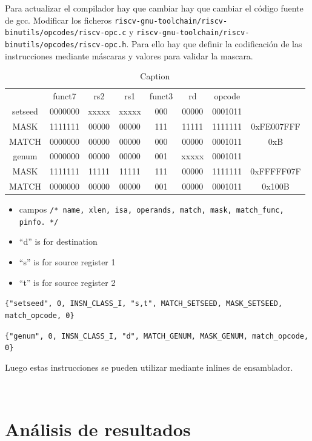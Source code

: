 Para actualizar el compilador hay que cambiar hay que cambiar el código fuente de gcc. Modificar los ficheros \texttt{riscv-gnu-toolchain/riscv-binutils/opcodes/riscv-opc.c} y \texttt{riscv-gnu-toolchain/riscv-binutils/opcodes/riscv-opc.h}. Para ello hay que definir la codificación de las instrucciones mediante máscaras y valores para validar la mascara.
\begin{table}[H]
    \centering
    \caption{Caption}
    \label{tab:my_label}
    \begin{tabular}{cccccccc}
        &  funct7 &  rs2 &  rs1 &  funct3 &  rd &  opcode & \\
        setseed &  0000000 &  xxxxx &  xxxxx &  000 &  00000 &  0001011 & \\
        MASK &  1111111 &  00000 &  00000 &  111 &  11111 &  1111111 & 0xFE007FFF \\
        MATCH &  0000000 &  00000 &  00000 &  000 &  00000 &  0001011 & 0xB\\
        genum & 0000000 & 00000 & 00000 & 001& xxxxx & 0001011 &\\
        MASK & 1111111 & 11111 & 11111 & 111& 00000 & 1111111 & 0xFFFFF07F\\
        MATCH & 0000000 & 00000 & 00000 & 001& 00000 & 0001011 & 0x100B\\
    \end{tabular}
\end{table}

\begin{itemize}
\item campos \texttt{/* name, xlen, isa, operands, match, mask, match\_func, pinfo.  */}
\item “d” is for destination
\item “s” is for source register 1
\item “t” is for source register 2
\end{itemize}

\texttt{\{"setseed", 0, INSN\_CLASS\_I, "s,t", MATCH\_SETSEED, MASK\_SETSEED, match\_opcode, 0\}}

\texttt{\{"genum", 0, INSN\_CLASS\_I, "d", MATCH\_GENUM, MASK\_GENUM, match\_opcode, 0\}}

Luego estas instrucciones se pueden utilizar mediante inlines de ensamblador.

\begin{verbatim}
    
\end{verbatim}

\section{Análisis de resultados}

